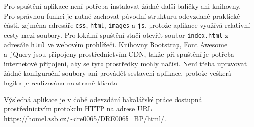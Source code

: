 Pro spuštění aplikace není potřeba instalovat žádné další balíčky ani knihovny. Pro správnou funkci je nutné zachovat původní strukturu odevzdané praktické části, zejména adresáře \texttt{css}, \texttt{html}, \texttt{images} a \texttt{js}, protože aplikace využívá relativní cesty mezi soubory. Pro lokální spuštění stačí otevřít soubor \texttt{index.html} z adresáře \texttt{html} ve webovém prohlížeči. Knihovny Bootstrap, Font Awesome a~jQuery jsou připojeny prostřednictvím CDN, takže při spuštění je potřeba internetové připojení, aby se tyto prostředky mohly načíst. Není třeba upravovat žádné konfigurační soubory ani provádět sestavení aplikace, protože veškerá logika je realizována na straně klienta.

Výsledná aplikace je v době odevzdání bakalářské práce dostupná prostřednictvím protokolu HTTP na adrese URL \url{https://homel.vsb.cz/~dre0065/DRE0065_BP/html/}.